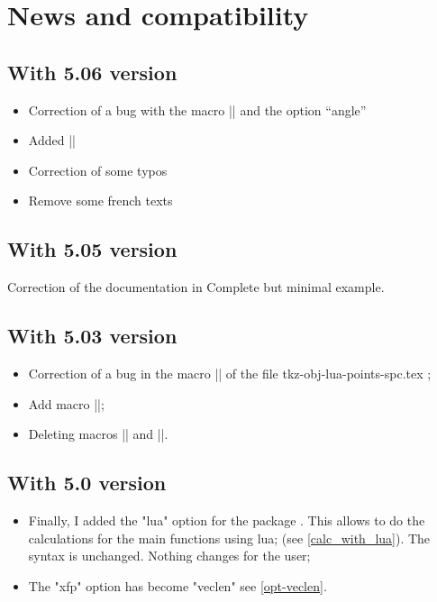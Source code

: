 \section*{News and compatibility}
\subsection{With 5.06 version}
     \begin{itemize}
      \item Correction of a bug with the macro |\tkzLabelAngle| and the option “angle”
       \item Added |\tkzSetUpCircle|
       \item Correction of some typos
       \item Remove some french texts
     \end{itemize}

     
\subsection{With 5.05 version}

 Correction of the documentation in Complete but minimal example.

\subsection{With 5.03 version}

\begin{itemize}
  
    \item Correction of a bug in the macro |\tkzDefBarycentricPointTwo| of the file tkz-obj-lua-points-spc.tex ;
   
  \item Add macro  |\tkzDrawEllipse|;
  
  \item Deleting macros |\tkzDrawSectorAngles| and |\tkzDrawSectorRwithNodesAngles|.
\end{itemize}


\subsection{With 5.0 version} %

\begin{itemize}
  
    \item Finally, I added the "lua" option for the package \tkzname{\tkznameofpack}. This allows to do the calculations for the main functions using lua; (see \ref{calc_with_lua}). The syntax is unchanged. Nothing changes for the user;
   
  \item The "xfp" option has become  "veclen" see \ref{opt-veclen}.

\end{itemize}

